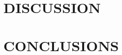 \documentclass[sigconf]{acmart}
\begin{document}
\section{DISCUSSION}






\section{CONCLUSIONS}







\addtolength{\textheight}{-12cm}   %


\end{document}

